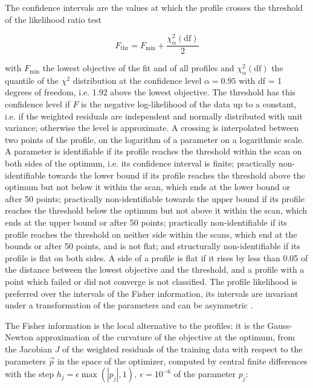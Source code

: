 The confidence intervals are the values at which the profile crosses the threshold of the likelihood ratio test

\begin{equation}
F_{\mathrm{thr}} = F_{\min} + \frac{\chi^2_{\alpha}(\mathrm{df})}{2}
\end{equation}

with $F_{\min}$ the lowest objective of the fit and of all profiles and $\chi^2_{\alpha}(\mathrm{df})$ the quantile of the $\chi^2$ distribution at the confidence level $\alpha = 0.95$ with df = 1 degrees of freedom, i.e. 1.92 above the lowest objective. The threshold has this confidence level if $F$ is the negative log-likelihood of the data up to a constant, i.e. if the weighted residuals are independent and normally distributed with unit variance; otherwise the level is approximate. A crossing is interpolated between two points of the profile, on the logarithm of a parameter on a logarithmic scale. A parameter is identifiable if its profile reaches the threshold within the scan on both sides of the optimum, i.e. its confidence interval is finite; practically non-identifiable towards the lower bound if its profile reaches the threshold above the optimum but not below it within the scan, which ends at the lower bound or after 50 points; practically non-identifiable towards the upper bound if its profile reaches the threshold below the optimum but not above it within the scan, which ends at the upper bound or after 50 points; practically non-identifiable if its profile reaches the threshold on neither side within the scans, which end at the bounds or after 50 points, and is not flat; and structurally non-identifiable if its profile is flat on both sides. A side of a profile is flat if it rises by less than 0.05 of the distance between the lowest objective and the threshold, and a profile with a point which failed or did not converge is not classified. The profile likelihood is preferred over the intervals of the Fisher information, its intervals are invariant under a transformation of the parameters and can be asymmetric \cite{Wieland2021}.

The Fisher information is the local alternative to the profiles: it is the Gauss-Newton approximation of the curvature of the objective at the optimum, from the Jacobian $J$ of the weighted residuals of the training data with respect to the parameters $\vec{p}$ in the space of the optimizer, computed by central finite differences with the step $h_j = \epsilon \max(|p_j|, 1),\ \epsilon = 10^{-6}$ of the parameter $p_j$:

